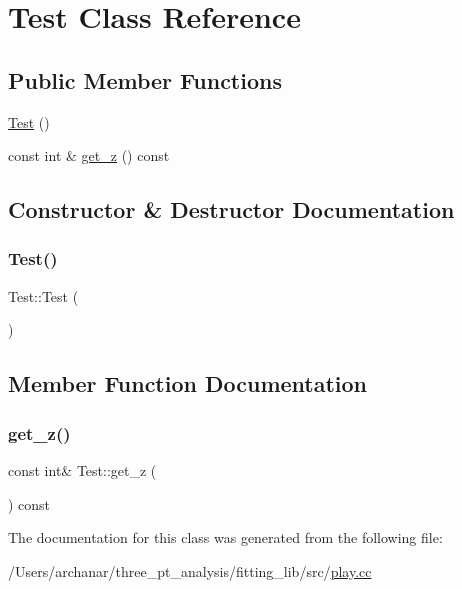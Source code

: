 \hypertarget{classTest}{}\section{Test Class Reference}
\label{classTest}
\subsection*{Public Member Functions}
\begin{DoxyCompactItemize}
\item 
\mbox{\hyperlink{classTest_a99f2bbfac6c95612322b0f10e607ebe5}{Test}} ()
\item 
const int \& \mbox{\hyperlink{classTest_a5e3052f14ba941e3a3f3b54cdc352ccf}{get\+\_\+z}} () const
\end{DoxyCompactItemize}


\subsection{Constructor \& Destructor Documentation}
\mbox{\label{classTest_a99f2bbfac6c95612322b0f10e607ebe5}} 
\subsubsection{\texorpdfstring{Test()}{Test()}}
{\footnotesize\ttfamily Test\+::\+Test (\begin{DoxyParamCaption}{ }\end{DoxyParamCaption})\hspace{0.3cm}{\ttfamily [inline]}}



\subsection{Member Function Documentation}
\mbox{\label{classTest_a5e3052f14ba941e3a3f3b54cdc352ccf}} 
\subsubsection{\texorpdfstring{get\_z()}{get\_z()}}
{\footnotesize\ttfamily const int\& Test\+::get\+\_\+z (\begin{DoxyParamCaption}{ }\end{DoxyParamCaption}) const\hspace{0.3cm}{\ttfamily [inline]}}



The documentation for this class was generated from the following file\+:\begin{DoxyCompactItemize}
\item 
/\+Users/archanar/three\+\_\+pt\+\_\+analysis/fitting\+\_\+lib/src/\mbox{\hyperlink{play_8cc}{play.\+cc}}\end{DoxyCompactItemize}
